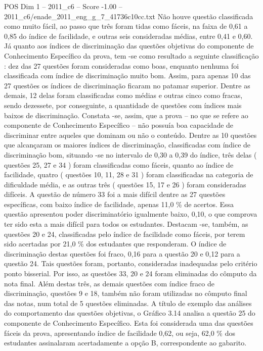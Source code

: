 \begin{textsample}{POS Dim 1 – 2011\_c6 – Score -1.00 – 2011\_c6/enade\_2011\_eng\_g\_7\_41736c10cc.txt}
Não houve questão classificada como muito fácil, ao passo que três foram tidas como fáceis, na faixa de 0,61 a 0,85 do índice de facilidade, e outras seis consideradas médias, entre 0,41 e 0,60.
Já quanto aos índices de discriminação das questões objetivas do componente de Conhecimento Específico da prova, tem -se como resultado a seguinte classificação : dez das 27 questões foram consideradas como boas, enquanto nenhuma foi classificada com índice de discriminação muito bom.
Assim, para apenas 10 das 27 questões os índices de discriminação ficaram no patamar superior.
Dentre as demais, 12 delas foram classificadas como médias e outras cinco como fracas, sendo dezessete, por conseguinte, a quantidade de questões com índices mais baixos de discriminação.
Constata -se, assim, que a prova – no que se refere ao componente de Conhecimento Específico – não possuía boa capacidade de discriminar entre aqueles que dominam ou não o conteúdo.
Dentre as 10 questões que alcançaram os maiores índices de discriminação, classificadas com índice de discriminação bom, situando -se no intervalo de 0,30 a 0,39 do índice, três delas ( questões 25, 27 e 34 ) foram classificadas como fáceis, quanto ao índice de facilidade, quatro ( questões 10, 11, 28 e 31 ) foram classificadas na categoria de dificuldade média, e as outras três ( questões 15, 17 e 26 ) foram consideradas difíceis.
A questão de número 33 foi a mais difícil dentre as 27 questões específicas, com baixo índice de facilidade, apenas 11,0 \% de acertos.
Essa questão apresentou poder discriminatório igualmente baixo, 0,10, o que comprova ter sido esta a mais difícil para todos os estudantes.
Destacam -se, também, as questões 20 e 24, classificadas pelo índice de facilidade como fáceis, por terem sido acertadas por 21,0 \% dos estudantes que responderam.
O índice de discriminação destas questões foi fraco, 0,16 para a questão 20 e 0,12 para a questão 24.
Tais questões foram, portanto, consideradas inadequadas pelo critério ponto bisserial.
Por isso, as questões 33, 20 e 24 foram eliminadas do cômputo da nota final.
Além destas três, as demais questões com índice fraco de discriminação, questões 9 e 18, também não foram utilizadas no cômputo final das notas, num total de 5 questões eliminadas.
A título de exemplo das análises do comportamento das questões objetivas, o Gráfico 3.14 analisa a questão 25 do componente de Conhecimento Específico.
Esta foi considerada uma das questões fáceis da prova, apresentando índice de facilidade 0,62, ou seja, 62,0 \% dos estudantes assinalaram acertadamente a opção B, correspondente ao gabarito.

\end{textsample}
